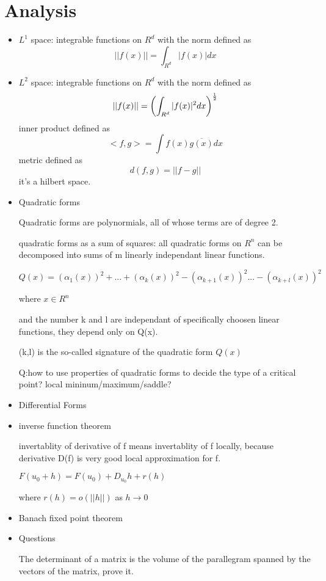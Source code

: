 \documentclass[10pt,a4paper]{book}
\begin{document}
\section{Analysis}
\begin{itemize}
	\item $L^1$ space: integrable functions on $R^d$ with the norm defined as $$ ||f(x)|| = \int_{R^d} |f(x)|dx $$
	
	\item $L^2$ space: integrable functions on $R^d$ with the norm defined as $$ ||f(x)|| = \left( \int_{R^d} |f(x)|^2 dx \right) ^{1 \over 2} $$
	inner product defined as  $$<f,g> = \int f(x) \overline{g(x)} dx$$
	metric defined as $$d(f,g) = ||f-g||$$
	it's a hilbert space.
	
	\item {Quadratic forms}
	
	Quadratic forms are polynormials, all of whose terms are of degree 2. 
	
	quadratic forms as a sum of squares: all quadratic forms on $R^n$ can be decomposed into sums of m linearly independant linear functions. 
	
	$$Q(x) = (\alpha_1(x))^2 + ... + (\alpha_k(x))^2 - (\alpha_{k+1}(x))^2 ... - (\alpha_{k+l}(x))^2$$
	
	where $x \in R^n$
	
	and the number k and l are independant of specifically choosen linear functions, they depend only on Q(x).
	
	(k,l) is the so-called signature of the quadratic form $Q(x)$
	
	Q:how to use properties of quadratic forms to decide the type of a critical point? local mininum/maximum/saddle?
	
	
	\item Differential Forms
	\item inverse function theorem
	
	
	invertablity of derivative of f means invertablity of f locally, because derivative D(f) is very good local approximation for f.
	
	$F(u_0+h) = F(u_0) + D_{u_0}h + r(h)$
	
	where $r(h) = o(||h||)$ as $h \to 0$
	
	\item Banach fixed point theorem
	
	\item Questions
	
	The determinant of a matrix is the volume of the parallegram spanned by the vectors of the matrix, prove it.
	
	
	
\end{itemize}
\end{document}
